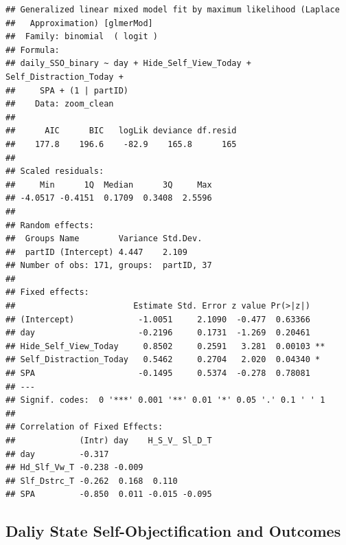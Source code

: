 \documentclass[
  english,
  man]{apa7}
\begin{document}
\begin{verbatim}
## Generalized linear mixed model fit by maximum likelihood (Laplace
##   Approximation) [glmerMod]
##  Family: binomial  ( logit )
## Formula: 
## daily_SSO_binary ~ day + Hide_Self_View_Today + Self_Distraction_Today +  
##     SPA + (1 | partID)
##    Data: zoom_clean
## 
##      AIC      BIC   logLik deviance df.resid 
##    177.8    196.6    -82.9    165.8      165 
## 
## Scaled residuals: 
##     Min      1Q  Median      3Q     Max 
## -4.0517 -0.4151  0.1709  0.3408  2.5596 
## 
## Random effects:
##  Groups Name        Variance Std.Dev.
##  partID (Intercept) 4.447    2.109   
## Number of obs: 171, groups:  partID, 37
## 
## Fixed effects:
##                        Estimate Std. Error z value Pr(>|z|)   
## (Intercept)             -1.0051     2.1090  -0.477  0.63366   
## day                     -0.2196     0.1731  -1.269  0.20461   
## Hide_Self_View_Today     0.8502     0.2591   3.281  0.00103 **
## Self_Distraction_Today   0.5462     0.2704   2.020  0.04340 * 
## SPA                     -0.1495     0.5374  -0.278  0.78081   
## ---
## Signif. codes:  0 '***' 0.001 '**' 0.01 '*' 0.05 '.' 0.1 ' ' 1
## 
## Correlation of Fixed Effects:
##             (Intr) day    H_S_V_ Sl_D_T
## day         -0.317                     
## Hd_Slf_Vw_T -0.238 -0.009              
## Slf_Dstrc_T -0.262  0.168  0.110       
## SPA         -0.850  0.011 -0.015 -0.095
\end{verbatim}

\hypertarget{daliy-state-self-objectification-and-outcomes}{%
\subsection{Daliy State Self-Objectification and Outcomes}\label{daliy-state-self-objectification-and-outcomes}}
\end{document}

